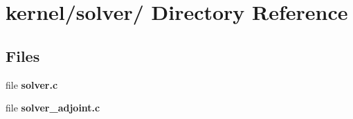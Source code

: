 \hypertarget{dir_000034}{
\section{kernel/solver/ Directory Reference}
\label{dir_000034}
}
\subsection*{Files}
\begin{CompactItemize}
\item 
file {\bf solver.c}
\item 
file {\bf solver\_\-adjoint.c}
\end{CompactItemize}
